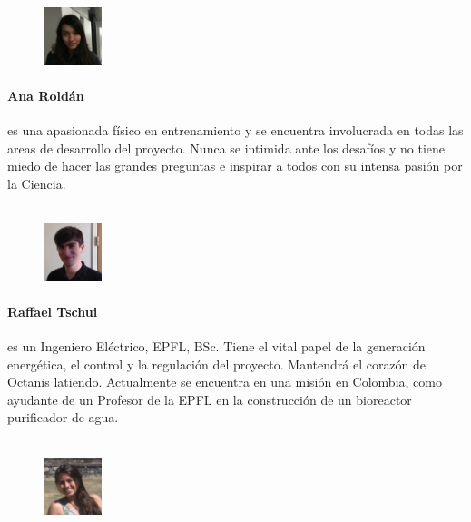 \documentclass[a4paper,12pt]{article}
\begin{document}
\begin{figure}
    \centering
    \vspace{-13pt}
    \includegraphics[width=0.15\textwidth]{ana}
\end{figure}
\paragraph{Ana Roldán} es una apasionada físico en entrenamiento y se encuentra involucrada en todas las areas de desarrollo del proyecto. Nunca se intimida ante los desafíos  y no tiene miedo de hacer las grandes preguntas e inspirar a todos con su intensa pasión por la Ciencia.
\\ \\

\begin{figure}
     \centering
     \vspace{-13pt}
    \includegraphics[width=0.15\textwidth]{raf}
\end{figure} 
\paragraph{Raffael Tschui} es un Ingeniero Eléctrico, EPFL, BSc. Tiene el vital papel de la generación energética, el control y la regulación del proyecto. Mantendrá el corazón de Octanis latiendo. Actualmente se encuentra en una misión en Colombia, como ayudante de un Profesor de la EPFL en la construcción de un bioreactor purificador de agua.
\\ \\

\begin{figure}
    \centering
    \vspace{-13pt}
    \includegraphics[width=0.15\textwidth]{pam}
\end{figure} 
\end{document}
